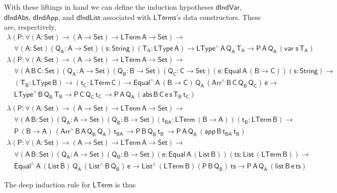 \documentclass[9pt]{entcs}
\begin{document}
With these liftings in hand we can define the induction hypotheses
$\mathsf{dIndVar}$, $\mathsf{dIndAbs}$, $\mathsf{dIndApp}$, and
$\mathsf{dIndList}$ associated with $\mathsf{LTerms}$'s data
constructors. These are, respectively,
\[\begin{array}{l}
\mathsf{\lambda (P : \forall (A : Set) \to (A \to Set) \to
  LTerm\,A  \to Set) \to}\\
  \quad\mathsf{\forall (A : Set) (Q_A : A \to Set) (s : String) (T_A :
  LType\, A) \to LType^{\wedge} \, A\, Q_A\, T_A \to P \, A\, Q_A\,
  (var \; s\, T_A)}\\[1ex]
  \mathsf{\lambda (P : \forall (A : Set) \to (A \to Set) \to
  LTerm\,A \to Set) \to} \\ 
  \quad\mathsf{
  \forall (A\,B\,C: Set) (Q_A : A \to Set)  (Q_B : B \to Set) (Q_C : C
  \to Set) (e : Equal\, A\, (B \to C)) (s : String) \to } \\ 
  \quad\mathsf{(T_B : LType\, B) \to (t_C : LTerm\, C)
  \to Equal^{\wedge}\,A\,(B \to C)\, Q_A \, (Arr^{\wedge} \, B\, C\,
  Q_B \, Q_C) \, e \to  } \\
  \quad\mathsf{
  LType^{\wedge}\, B\, Q_B\, T_B
  \to P\, C\, Q_C\, t_C\, 
  \to P \, A\, Q_A\, (abs \,B \,C \, e \,s \,T_B \, t_C)
  }\\[1ex]
\end{array}\]
\[\begin{array}{l}
  \mathsf{\lambda (P : \forall (A : Set) \to (A \to Set) \to LTerm\,A
    \to Set)\to} \\ 
  \quad \mathsf{
  \forall (A \,B : Set) (Q_A : A \to Set)  (Q_B : B \to Set) 
   (t_{BA} : LTerm\, (B \to A)) (t_B : LTerm\, B) \to} \\
  \quad \mathsf{
  P\, (B \to A)\, (Arr^{\wedge} \, B\, A\, Q_B \, Q_A) \, t_{BA} \, 
  \to P\, B\, Q_B\, t_B\, 
  \to P \, A\, Q_A\, (app \,B \,t_{BA} \, t_B) }\\[1ex]
  \mathsf{\lambda (P : \forall (A : Set) \to (A \to Set) \to LTerm\,A
    \to Set) \to} \\ 
  \quad \mathsf{
  \forall (A \,B : Set) (Q_A : A \to Set)  (Q_B : B \to Set) 
    (e : Equal\, A\, (List\, B)) (ts : List\, (LTerm\, B)) \to} \\ 
  \quad \mathsf{
    Equal^{\wedge}\, A\, (List\,B)\, Q_A\, (List^{\wedge}\, B\, Q_B)\, e 
  \to List^{\wedge}\, (LTerm\,B) (P\, B\, Q_B)\, ts
  \to P \, A\, Q_A\, (list \,B \,e \, ts) }
\end{array}\]

\noindent
The deep induction rule for $\mathsf{LTerm}$ is thus
\end{document}

